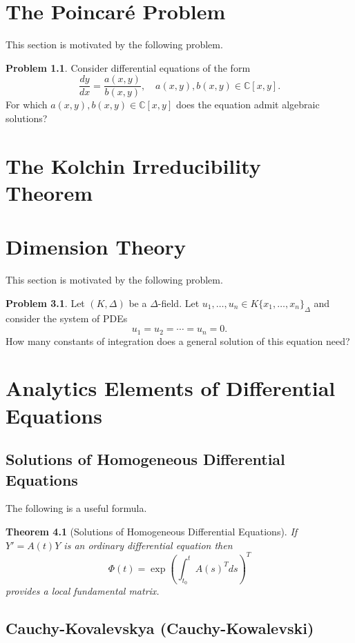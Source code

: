 \documentclass[12pt]{book}
\numberwithin{equation}{section}
\newtheorem{theorem}{Theorem}[subsection]
\theoremstyle{definition}
\newtheorem{problem}[theorem]{Problem}
\theoremstyle{remark}
\newcommand{\CC}{\mathbb{C}}
\begin{document}
\chapter[Poincar\'e Problem]{The Poincar\'e Problem}

This section is motivated by the following problem.
\begin{problem}
	Consider differential equations of the form
	 $$ \dfrac{dy}{dx} = \frac{a(x,y)}{b(x,y)}, \quad a(x,y),b(x,y) \in \CC[x,y].$$
	 For which $a(x,y),b(x,y) \in \CC[x,y]$ does the equation admit algebraic solutions?
\end{problem}


\chapter[Kolchin Irreducibility]{The Kolchin Irreducibility Theorem}\label{S:kolchin-irreducibility}


\chapter[Dimension Theory]{Dimension Theory}\label{S:dimension-theory}

This section is motivated by the following problem.
\begin{problem}
	Let $(K,\Delta)$ be a $\Delta$-field. 
	Let $u_1,\ldots,u_n \in K\lbrace x_1,\ldots,x_n\rbrace_{\Delta}$ and consider the system of PDEs
	 $$ u_1=u_2=\cdots=u_n=0. $$
	How many constants of integration does a general solution of this equation need?
\end{problem}

\appendix 
\chapter[Analytic Elements]{Analytics Elements of Differential Equations}

\section{Solutions of Homogeneous Differential Equations}
The following is a useful formula.
\begin{theorem}[Solutions of Homogeneous Differential Equations]\label{T:solutions}
	If $Y'= A(t)Y$ is an ordinary differential equation then 
	 $$ \Phi(t) = \exp( \int_{t_0}^t A(s)^T ds )^T $$
	provides a local fundamental matrix. 
\end{theorem}



\section{Cauchy-Kovalevskya (Cauchy-Kowalevski)}

\backmatter





\end{document}
